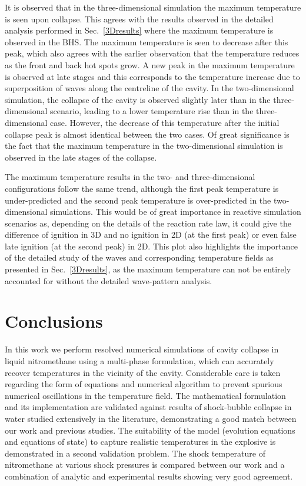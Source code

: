 \documentclass[3p,times,twocolumn]{elsarticle}
\begin{document}
It is observed that in the three-dimensional simulation the maximum temperature is seen upon collapse. This agrees with the results observed in the detailed analysis performed in Sec.\ \ref{3Dresults} where the maximum temperature is observed in the BHS. The maximum temperature is seen to decrease after this peak, which also agrees with the earlier observation that the temperature reduces as the front and back hot spots grow. A new peak in the maximum temperature is observed at late stages and this corresponds to the temperature increase due to superposition of waves along the centreline of the cavity. In the two-dimensional simulation, the collapse of the cavity is observed slightly later than in the three-dimensional scenario, leading to a lower temperature rise than in the three-dimensional case. However, the decrease of this temperature after the initial collapse peak is almost identical between the two cases. Of great significance is the fact that the maximum temperature in the two-dimensional simulation is observed in the late stages of the collapse.


The maximum temperature results in the two- and three-dimensional configurations follow the same trend, although the first peak temperature is under-predicted and the second peak temperature is over-predicted in the two-dimensional simulations. This would be of great importance in reactive simulation scenarios as, depending on the details of the reaction rate law, it could give the difference of ignition in 3D and no ignition in 2D (at the first peak) or even false late ignition (at the second peak) in 2D. This plot also highlights the importance of the detailed study of the waves and corresponding temperature fields as presented in Sec.\ \ref{3Dresults}, as the maximum temperature can not be entirely accounted for without the detailed wave-pattern analysis.




\section{Conclusions}

In this work we perform resolved numerical simulations of cavity collapse in liquid nitromethane
using a multi-phase formulation, which can accurately recover temperatures in the vicinity of the cavity. Considerable care is taken regarding the form of equations and numerical algorithm to prevent spurious numerical oscillations in the temperature field. The mathematical formulation and its implementation are validated against results of shock-bubble collapse in water studied extensively in the literature, demonstrating a good match between our work and previous studies. The suitability of the model (evolution equations and equations of state) to capture realistic temperatures in the explosive is demonstrated in a second validation problem. The shock temperature of nitromethane at various shock pressures is compared between our work and a combination of analytic and experimental results showing very good agreement.
\end{document}

